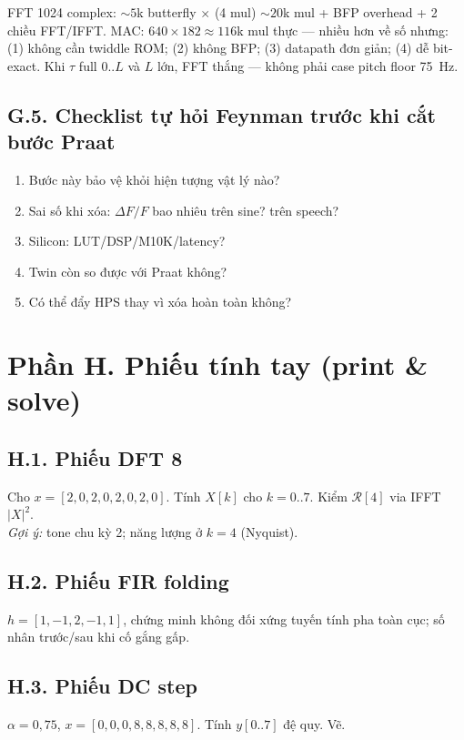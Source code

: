FFT 1024 complex: $\sim5$k butterfly $\times$ (4 mul) $\sim20$k mul + BFP overhead + 2 chiều FFT/IFFT.
MAC: $640\times182\approx116$k mul thực --- nhiều hơn về số nhưng: (1) không cần twiddle ROM; (2) không BFP; (3) datapath đơn giản; (4) dễ bit-exact. Khi $\tau$ full $0..L$ và $L$ lớn, FFT thắng --- không phải case pitch floor 75~Hz.

\subsection*{G.5. Checklist tự hỏi Feynman trước khi cắt bước Praat}

\begin{enumerate}\setlength{\itemsep}{2pt}
\item Bước này bảo vệ khỏi hiện tượng vật lý nào?
\item Sai số khi xóa: $\Delta F/F$ bao nhiêu trên sine? trên speech?
\item Silicon: LUT/DSP/M10K/latency?
\item Twin còn so được với Praat không?
\item Có thể đẩy HPS thay vì xóa hoàn toàn không?
\end{enumerate}

\newpage
\section*{Phần H. Phiếu tính tay (print \& solve)}

\subsection*{H.1. Phiếu DFT 8}
Cho $x=[2,0,2,0,2,0,2,0]$. Tính $X[k]$ cho $k=0..7$. Kiểm $\mathcal{R}[4]$ via IFFT $|X|^2$. \\
\textit{Gợi ý:} tone chu kỳ 2; năng lượng ở $k=4$ (Nyquist).

\subsection*{H.2. Phiếu FIR folding}
$h=[1,−1,2,−1,1]$, chứng minh không đối xứng tuyến tính pha toàn cục; số nhân trước/sau khi cố gắng gấp.

\subsection*{H.3. Phiếu DC step}
$\alpha=0{,}75$, $x=[0,0,0,8,8,8,8,8]$. Tính $y[0..7]$ đệ quy. Vẽ.

